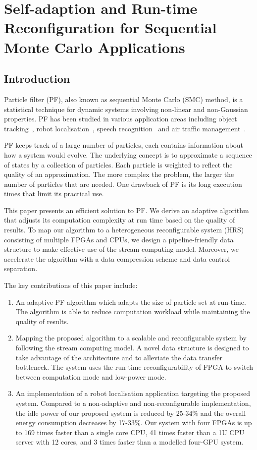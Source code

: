 
\chapter[Self-adaption \& Run-time Reconfiguration for SMC Applications]{Self-adaption and Run-time Reconfiguration for Sequential Monte Carlo Applications}

\label{ch:run-time}

\section{Introduction}

Particle filter (PF), also known as sequential Monte Carlo (SMC) method, is a statistical technique for dynamic systems involving non-linear and non-Gaussian properties. 
PF has been studied in various application areas including object tracking~\cite{happe11}, robot localisation~\cite{montemerlo02}, speech recognition~\cite{vermaak02} and air traffic management~\cite{eele11}.

PF keeps track of a large number of particles, each contains information about how a system would evolve.
The underlying concept is to approximate a sequence of states by a collection of particles.
Each particle is weighted to reflect the quality of an approximation.
The more complex the problem, the larger the number of particles that are needed.
One drawback of PF is its long execution times that limit its practical use.

This paper presents an efficient solution to PF.
We derive an adaptive algorithm that adjusts its computation complexity at run time based on the quality of results.
To map our algorithm to a heterogeneous reconfigurable system (HRS) consisting of multiple FPGAs and CPUs,
we design a pipeline-friendly data structure to make effective use of the stream computing model.
Moreover, we accelerate the algorithm with a data compression scheme and data control separation.

The key contributions of this paper include:

\begin{enumerate}
\item An adaptive PF algorithm which adapts the size of particle set at run-time. 
The algorithm is able to reduce computation workload while maintaining the quality of results.
\item Mapping the proposed algorithm to a scalable and reconfigurable system by following the stream computing model.
A novel data structure is designed to take advantage of the architecture and to alleviate the data transfer bottleneck.
The system uses the run-time reconfigurability of FPGA to switch between computation mode and low-power mode.
\item An implementation of a robot localisation application targeting the proposed system. 
Compared to a non-adaptive and non-reconfigurable implementation, the idle power of our proposed system is reduced by 25-34\% and the overall energy consumption decreases by 17-33\%.
Our system with four FPGAs is up to 169 times faster than a single core CPU, 41 times faster than a 1U CPU server with 12 cores, and 3 times faster than a modelled four-GPU system.
\end{enumerate}

